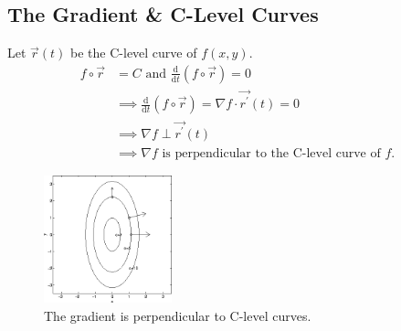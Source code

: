 \subsection{The Gradient \& C-Level Curves}
\noindent
Let $\vec{r}(t)$ be the C-level curve of $f(x, y)$.
\begin{align*}
f\circ\vec{r} &= C  \text{ and } \frac{\mathrm{d}}{\mathrm{d}t}(f\circ\vec{r}) = 0 \\
	&\implies \frac{\mathrm{d}}{\mathrm{d}t}(f\circ\vec{r}) = \nabla f\cdot\vec{r^\prime}(t) = 0 \\
	&\implies \nabla f\perp\vec{r^\prime}(t) \\
	&\implies \nabla f \text{ is perpendicular to the C-level curve of } f.
\end{align*}

\begin{figure}[H]
	\centering
	\includegraphics[width=0.33\textwidth]{./Images/differentialMultivariableCalculus/grad_c_level.png}
	\caption{The gradient is perpendicular to C-level curves.}
\end{figure}